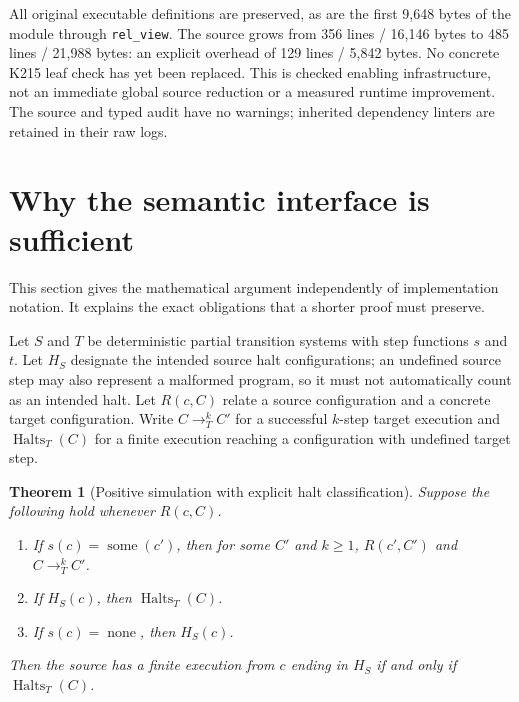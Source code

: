 \documentclass[11pt]{article}
\newtheorem{theorem}{Theorem}[section]
\newcommand{\Halts}{\operatorname{Halts}}
\newcommand{\code}[1]{\texttt{\small #1}}
\begin{document}
All original executable definitions are preserved, as are the first 9,648 bytes of the module through \code{rel\_view}. The source grows from 356 lines / 16,146 bytes to 485 lines / 21,988 bytes: an explicit overhead of 129 lines / 5,842 bytes. No concrete K215 leaf check has yet been replaced. This is checked enabling infrastructure, not an immediate global source reduction or a measured runtime improvement. The source and typed audit have no warnings; inherited dependency linters are retained in their raw logs.

\section{Why the semantic interface is sufficient}
\label{sec:simulation}

This section gives the mathematical argument independently of implementation notation. It explains the exact obligations that a shorter proof must preserve.

Let $S$ and $T$ be deterministic partial transition systems with step functions $s$ and $t$. Let $H_S$ designate the intended source halt configurations; an undefined source step may also represent a malformed program, so it must not automatically count as an intended halt. Let $R(c,C)$ relate a source configuration and a concrete target configuration. Write $C\to_T^k C'$ for a successful $k$-step target execution and $\Halts_T(C)$ for a finite execution reaching a configuration with undefined target step.

\begin{theorem}[Positive simulation with explicit halt classification]
\label{thm:positive}
Suppose the following hold whenever $R(c,C)$.
\begin{enumerate}
\item If $s(c)=\operatorname{some}(c')$, then for some $C'$ and $k\geq1$,
      $R(c',C')$ and $C\to_T^k C'$.
\item If $H_S(c)$, then $\Halts_T(C)$.
\item If $s(c)=\operatorname{none}$, then $H_S(c)$.
\end{enumerate}
Then the source has a finite execution from $c$ ending in $H_S$ if and only if $\Halts_T(C)$.
\end{theorem}
\end{document}
